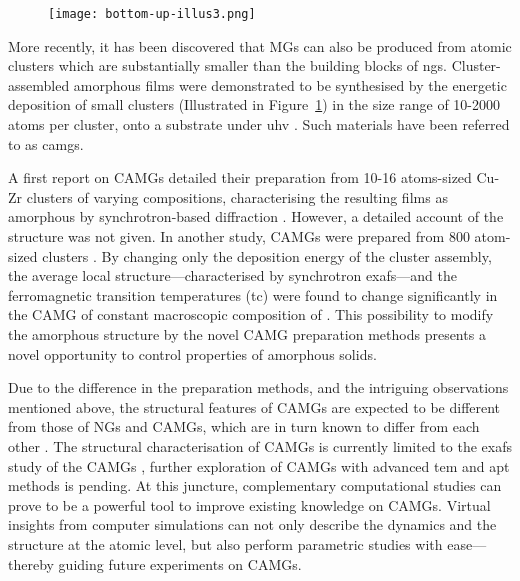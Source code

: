 \begin{figure}[!ht] \centering
	\texttt{[image: bottom-up-illus3.png]}
	\label{f:bottom-up}
\end{figure}

More recently, it has been discovered that MGs can also be produced from atomic clusters which are substantially smaller than the building blocks of \gls{ng}s. Cluster-assembled amorphous films were demonstrated to be synthesised by the 
energetic deposition of small clusters (Illustrated in Figure~\ref{f:bottom-up}) in the size range of 10-2000 atoms per cluster, onto a substrate under \gls{uhv} \cite{Kartouzian2013,Kartouzian2014,Benel2019}. Such materials have been referred to as \glspl{camg}. \par 

A first report on CAMGs detailed their preparation from 10-16 atoms-sized Cu-Zr clusters of varying compositions, characterising the resulting films as amorphous by synchrotron-based diffraction \cite{Kartouzian2013,Kartouzian2014}. However, a detailed account of the structure was not given. In another study, \fs CAMGs were prepared from 800 atom-sized clusters \cite{Benel2019,Benel2018}. By changing only the deposition energy of the cluster assembly, the average local structure---characterised by synchrotron \gls{exafs}---and the ferromagnetic transition temperatures (\gls{tc}) were found to change significantly in the CAMG of constant macroscopic composition of \fs. This possibility to modify the amorphous structure by the novel CAMG preparation methods presents a novel opportunity to 
control properties of amorphous solids. \par

Due to the difference in the preparation methods, and the intriguing observations mentioned above, the structural features of CAMGs are expected to be different from those of NGs and CAMGs, which are in turn known to differ from each other \cite{Adjaoud2018,Ritter2011,Nandam2017,Wang2017}. The structural characterisation of CAMGs is currently limited to the \gls{exafs} study of the \fs CAMGs \cite{Benel2019}, further exploration of CAMGs with advanced \gls{tem} and \gls{apt} methods is pending. At this juncture, complementary computational studies can prove to be a powerful tool to improve existing knowledge on CAMGs. Virtual insights from computer simulations can not only describe the dynamics and the structure at the atomic level, but also perform parametric studies with ease---thereby guiding future experiments on 
CAMGs. \par

